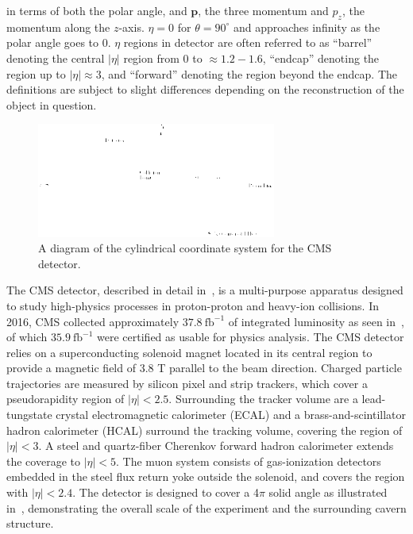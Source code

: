 in terms of both the polar angle, and $\textbf{p}$, the three momentum and $p_{z}$, the momentum along the $z$-axis. $\eta=0$ for $\theta=90^\circ$ and approaches infinity as the polar angle goes to 0. $\eta$ regions in detector are often referred to as ``barrel'' denoting the central $|\eta|$ region from 0 to $\approx 1.2-1.6$, ``endcap'' denoting the region up to $|\eta|\approx 3$, and ``forward'' denoting the region beyond the endcap. The definitions are subject to slight differences depending on the reconstruction of the object in question.

\begin{figure}
  \centering
  \includegraphics[width=0.7\textwidth]{figs/Figures_T_Coordinate.png}
  \caption{A diagram of the cylindrical coordinate system for the CMS detector.}
  \label{fig:coordinates}
\end{figure}

The CMS detector, described in detail in~\cite{Chatrchyan:2008aa}, is a multi-purpose apparatus designed to study high-\pt physics processes in proton-proton and heavy-ion collisions. In 2016, CMS collected approximately $37.8\:\textrm{fb}^{-1}$ of integrated luminosity as seen in~, of which $35.9\:\textrm{fb}^{-1}$ were certified as usable for physics analysis. The CMS detector relies on a superconducting solenoid magnet located in its central region to provide a magnetic field of 3.8 T parallel to the beam direction. Charged particle trajectories are measured by silicon pixel and strip trackers, which cover a pseudorapidity region of $|\eta| < 2.5$. Surrounding the tracker volume are a lead-tungstate crystal electromagnetic calorimeter (ECAL) and a brass-and-scintillator hadron calorimeter (HCAL) surround the tracking volume, covering the region of $|\eta| < 3$. A steel and quartz-fiber Cherenkov forward hadron calorimeter extends the coverage to $|\eta| < 5$. The muon system consists of gas-ionization detectors embedded in the steel flux return yoke outside the solenoid, and covers the region with $|\eta| < 2.4$. The detector is designed to cover a 4$\pi$ solid angle as illustrated in~, demonstrating the overall scale of the experiment and the surrounding cavern structure.


